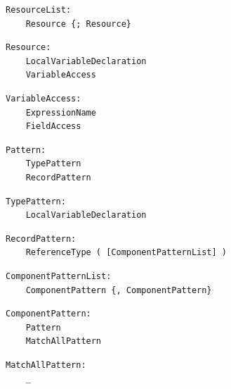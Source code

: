 \noindent\textbf{\texttt{}}\par
\begin{lstlisting}
ResourceList:
    Resource {; Resource}
\end{lstlisting}

\noindent\textbf{\texttt{}}\par
\begin{lstlisting}
Resource:
    LocalVariableDeclaration
    VariableAccess
\end{lstlisting}

\noindent\textbf{\texttt{}}\par
\begin{lstlisting}
VariableAccess:
    ExpressionName
    FieldAccess
\end{lstlisting}

\noindent\textbf{\texttt{}}\par
\begin{lstlisting}
Pattern:
    TypePattern
    RecordPattern
\end{lstlisting}

\noindent\textbf{\texttt{}}\par
\begin{lstlisting}
TypePattern:
    LocalVariableDeclaration
\end{lstlisting}

\noindent\textbf{\texttt{}}\par
\begin{lstlisting}
RecordPattern:
    ReferenceType ( [ComponentPatternList] )
\end{lstlisting}

\noindent\textbf{\texttt{}}\par
\begin{lstlisting}
ComponentPatternList:
    ComponentPattern {, ComponentPattern}
\end{lstlisting}

\noindent\textbf{\texttt{}}\par
\begin{lstlisting}
ComponentPattern:
    Pattern
    MatchAllPattern
\end{lstlisting}

\noindent\textbf{\texttt{}}\par
\begin{lstlisting}
MatchAllPattern:
    _
\end{lstlisting}

